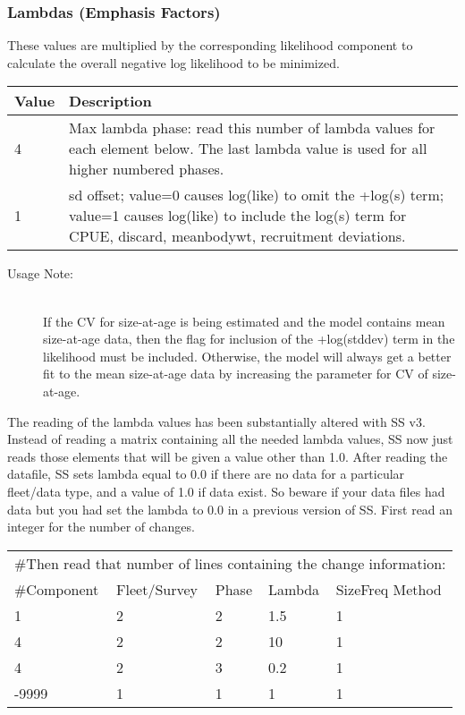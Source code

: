 \subsubsection{Lambdas (Emphasis Factors)}
These values are multiplied by the corresponding likelihood component to calculate the overall negative log likelihood to be minimized.

\begin{center}
	\begin{tabular}{p{2cm} p{14cm}}
		Value & Description \\
		\hline
		4 & Max lambda phase: read this number of lambda values for each element below.  The last lambda value is used for all higher numbered phases.\\
		1 & sd offset; value=0 causes log(like) to omit the +log(s) term; value=1 causes log(like) to include the log(s) term for CPUE, discard, meanbodywt, recruitment deviations. \\
		\hline
	\end{tabular}
\end{center}

\begin{description}
	\item[Usage Note:]\hfil\\
	If the CV for size-at-age is being estimated and the model contains mean size-at-age data, then the flag for inclusion of the +log(stddev) term in the likelihood must be included.  Otherwise, the model will always get a better fit to the mean size-at-age data by increasing the parameter for CV of size-at-age.
\end{description}

The reading of the lambda values has been substantially altered with SS v3.  Instead of reading a matrix containing all the needed lambda values, SS now just reads those elements that will be given a value other than 1.0.  After reading the datafile, SS sets lambda equal to 0.0 if there are no data for a particular fleet/data type, and a value of 1.0 if data exist.  So beware if your data files had data but you had set the lambda to 0.0 in a previous version of SS.  First read an integer for the number of changes.

\begin{center}
	\begin{longtable}{p{3cm} p{3cm} p{2cm} p{3cm} p{3cm}}
		\hline
		\multicolumn{5}{l}{\#Then read that number of lines containing the change information:}\\
		\#Component & Fleet/Survey & Phase & Lambda & SizeFreq Method \\
		\hline
		1 & 2 & 2 & 1.5 & 1 \\
		4 & 2 & 2 & 10 & 1 \\
		4 & 2 & 3 & 0.2 & 1 \\
		-9999 & 1 & 1 & 1 & 1 \\
		\hline
	\end{longtable}
\end{center}


